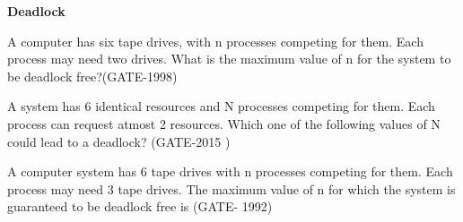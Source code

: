 \centerline{\textbf{ \LARGE Deadlock}}

\setcounter{question}{0}


\begin{minipage}{\linewidth}

  \question  A computer has six tape drives, with n processes competing for them. Each process may need two drives.
             What is the maximum value of n for the system to be deadlock free?(GATE-1998)

  \begin{oneparchoices}
  \end{oneparchoices}

  \end{minipage}

\vspace{0.08in}


\begin{minipage}{\linewidth}

  \question  A system has 6 identical resources and N processes competing for them. Each process can request atmost 2 resources. Which one of the following values of N could lead to a deadlock? (GATE-2015 )

  \begin{oneparchoices}
  \end{oneparchoices}

  \end{minipage}

\vspace{0.08in}


\begin{minipage}{\linewidth}

  \question  A computer system has 6 tape drives with n processes competing for them. Each process may need 3 tape drives. The maximum value of n for which the system is guaranteed to be deadlock free is (GATE- 1992)

  \begin{oneparchoices}
  \end{oneparchoices}

  \end{minipage}

